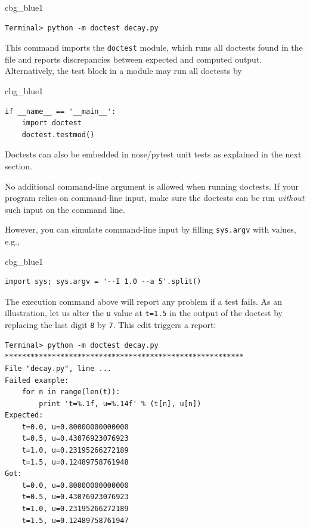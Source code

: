\documentclass[%
oneside,                 %
final,                   %
10pt]{article}
\newenvironment{_cod_tight}[1]{
   \def\FrameCommand{\colorbox{#1}}
   \FrameRule0.6pt\MakeFramed {\FrameRestore}\vskip3mm}
   {\vskip0mm\endMakeFramed}
\newenvironment{cod}[1]{
\bgroup\rmfamily
\fboxsep=0mm\relax
\begin{_cod_tight}{#1}
\list{}{\parsep=-2mm\parskip=0mm\topsep=0pt\leftmargin=2mm
\rightmargin=2\leftmargin\leftmargin=4pt\relax}
\item\relax}
{\endlist\end{_cod_tight}\egroup}
\newenvironment{warning_mdfboxadmon}[1][]{
\begin{warning_mdfboxmdframed}[frametitle=#1]
}
{
\end{warning_mdfboxmdframed}
}
\begin{document}
\begin{cod}{cbg_blue1}\begin{Verbatim}[numbers=none,fontsize=\fontsize{9pt}{9pt},baselinestretch=0.95,xleftmargin=2mm]
Terminal> python -m doctest decay.py
\end{Verbatim}
\end{cod}
\noindent
This command imports the \texttt{doctest} module, which runs all
doctests found in the file and reports discrepancies between
expected and computed output.
Alternatively, the test block in a module may run all doctests
by

\begin{cod}{cbg_blue1}\begin{Verbatim}[numbers=none,fontsize=\fontsize{9pt}{9pt},baselinestretch=0.95,xleftmargin=2mm]
if __name__ == '__main__':
    import doctest
    doctest.testmod()
\end{Verbatim}
\end{cod}
\noindent
Doctests can also be embedded in nose/pytest unit tests
as explained in the next section.


\begin{warning_mdfboxadmon}
No additional command-line argument is allowed when running doctests.
If your program relies on command-line input, make sure the doctests
can be run \emph{without} such input on the command line.

However, you can simulate command-line input by filling \texttt{sys.argv}
with values, e.g.,

\begin{cod}{cbg_blue1}\begin{Verbatim}[numbers=none,fontsize=\fontsize{9pt}{9pt},baselinestretch=0.95,xleftmargin=2mm]
import sys; sys.argv = '--I 1.0 --a 5'.split()
\end{Verbatim}
\end{cod}
\noindent
\end{warning_mdfboxadmon}



The execution command above will report any problem if a test fails.
As an illustration, let us alter the \texttt{u} value at \texttt{t=1.5} in
the output of the doctest by replacing the last digit \texttt{8} by \texttt{7}.
This edit triggers a report:

\begin{Verbatim}[frame=lines,label=\fbox{{\tiny Terminal}},framesep=2.5mm,framerule=0.7pt,fontsize=\fontsize{9pt}{9pt}]
Terminal> python -m doctest decay.py
********************************************************
File "decay.py", line ...
Failed example:
    for n in range(len(t)):
        print 't=%.1f, u=%.14f' % (t[n], u[n])
Expected:
    t=0.0, u=0.80000000000000
    t=0.5, u=0.43076923076923
    t=1.0, u=0.23195266272189
    t=1.5, u=0.12489758761948
Got:
    t=0.0, u=0.80000000000000
    t=0.5, u=0.43076923076923
    t=1.0, u=0.23195266272189
    t=1.5, u=0.12489758761947
\end{Verbatim}
\end{document}
